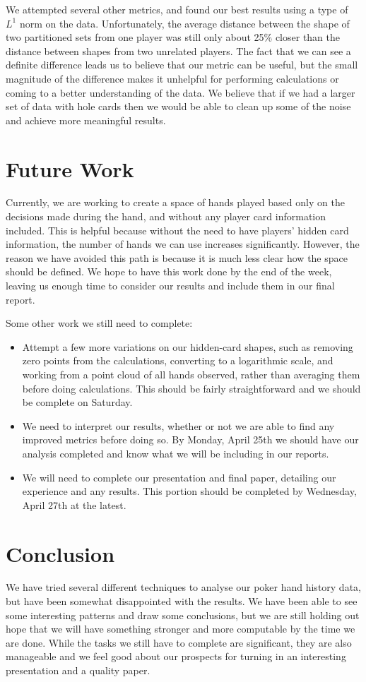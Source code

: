 \documentclass[11pt]{article}
\begin{document}
We attempted several other metrics, and found our best results using a type of
$L^1$ norm on the data. Unfortunately, the average distance between the shape of
two partitioned sets from one player was still only about 25\% closer than the
distance between shapes from two unrelated players. The fact that we can see a
definite difference leads us to believe that our metric can be useful, but the
small magnitude of the difference makes it unhelpful for performing calculations
or coming to a better understanding of the data. We believe that if we had a larger
set of data with hole cards then we would be able to clean up some of the noise
and achieve more meaningful results.


\section*{Future Work}
Currently, we are working to create a space of hands played based only on the
decisions made during the hand, and without any player card information
included. This is helpful because without the need to have players' hidden card
information, the number of hands we can use increases significantly. However,
the reason we have avoided this path is because it is much less clear how the
space should be defined. We hope to have this work done by the end of the week,
leaving us enough time to consider our results and include them in our final
report.

Some other work we still need to complete:

\begin{itemize}[noitemsep]
	\item Attempt a few more variations on our hidden-card shapes, such as
	removing zero points from the calculations, converting to a logarithmic
	scale, and working from a point cloud of all hands observed, rather than
	averaging them before doing calculations. This should be fairly straightforward
	and we should be complete on Saturday.
	\item We need to interpret our results, whether or not we are able to find
	any improved metrics before doing so. By Monday, April 25th we should have
	our analysis completed and know what we will be including in our reports.
	\item We will need to complete our presentation and final paper, detailing
	our experience and any results. This portion should be completed by Wednesday,
	April 27th at the latest.
\end{itemize}

\section*{Conclusion}
We have tried several different techniques to analyse our poker hand history data,
but have been somewhat disappointed with the results. We have been able to see
some interesting patterns and draw some conclusions, but we are still holding out
hope that we will have something stronger and more computable by the time we are 
done. While the tasks we still have to complete are significant, they are also
manageable and we feel good about our prospects for turning in an interesting
presentation and a quality paper.
\end{document}

